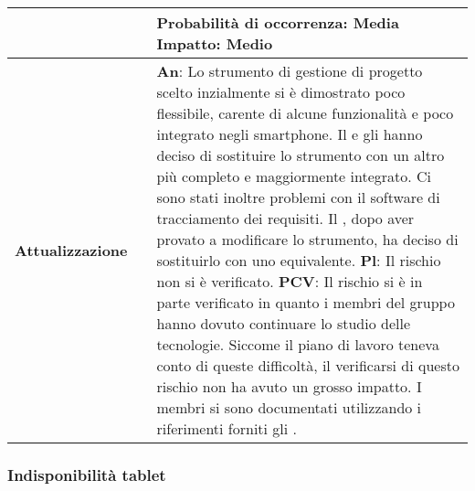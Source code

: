 \begin{table}[H]
\begin{center}
\begin{tabular}{p{2.5cm}p{0.5cm}p{11cm}}
			& &
			\textbf{Probabilità di occorrenza}: Media
			\newline
			\textbf{Impatto}: Medio
			\\
			\midrule
			\textbf{Attualizzazione}
			& &
			\textbf{An}: Lo strumento di gestione di progetto scelto inzialmente si è dimostrato poco flessibile, carente di alcune funzionalità e poco integrato negli smartphone. Il \responsabilediprogetto{} e gli \amministratori{} hanno deciso di sostituire lo strumento con un altro più completo e maggiormente integrato. Ci sono stati inoltre problemi con il software di tracciamento dei requisiti. Il \responsabilediprogetto, dopo aver provato a modificare lo strumento, ha deciso di sostituirlo con uno equivalente.
			\newline
			\textbf{Pl}: Il rischio non si è verificato.
			\newline
			\textbf{PCV}: Il rischio si è in parte verificato in quanto i membri del gruppo hanno dovuto continuare lo studio delle tecnologie. Siccome il piano di lavoro teneva conto di queste difficoltà, il verificarsi di questo rischio non ha avuto un grosso impatto. I membri si sono documentati utilizzando i riferimenti forniti gli \amministratori.
			\\
			\bottomrule	
		\end{tabular}
	\end{center}
\end{table}			

\newpage
\subsubsection{Indisponibilità tablet}
\label{subsec:indisponibilitaTablet}


